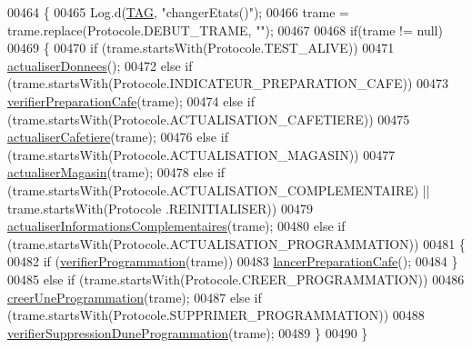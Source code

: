\begin{DoxyCode}
00464     \{
00465         Log.d(\hyperlink{classcom_1_1example_1_1ekawa_1_1_cafetiere_aa0c1fd99a2508b06c462aea17034aa91}{TAG}, \textcolor{stringliteral}{"changerEtats()"});
00466         trame = trame.replace(Protocole.DEBUT\_TRAME, \textcolor{stringliteral}{""});
00467 
00468         \textcolor{keywordflow}{if}(trame != null)
00469         \{
00470             \textcolor{keywordflow}{if} (trame.startsWith(Protocole.TEST\_ALIVE))
00471                 \hyperlink{classcom_1_1example_1_1ekawa_1_1_cafetiere_a1c6b2ea0e069cda876260e18ea8f6e84}{actualiserDonnees}();
00472             \textcolor{keywordflow}{else} \textcolor{keywordflow}{if} (trame.startsWith(Protocole.INDICATEUR\_PREPARATION\_CAFE))
00473                 \hyperlink{classcom_1_1example_1_1ekawa_1_1_cafetiere_ac2f81a08528b9f7017bfe6183fde876f}{verifierPreparationCafe}(trame);
00474             \textcolor{keywordflow}{else} \textcolor{keywordflow}{if} (trame.startsWith(Protocole.ACTUALISATION\_CAFETIERE))
00475                 \hyperlink{classcom_1_1example_1_1ekawa_1_1_cafetiere_a6485aa7504eeb5c3c09accab52bb3ad1}{actualiserCafetiere}(trame);
00476             \textcolor{keywordflow}{else} \textcolor{keywordflow}{if} (trame.startsWith(Protocole.ACTUALISATION\_MAGASIN))
00477                 \hyperlink{classcom_1_1example_1_1ekawa_1_1_cafetiere_a406c04398043ee4abca9902828197d91}{actualiserMagasin}(trame);
00478             \textcolor{keywordflow}{else} \textcolor{keywordflow}{if} (trame.startsWith(Protocole.ACTUALISATION\_COMPLEMENTAIRE) || trame.startsWith(Protocole
      .REINITIALISER))
00479                 \hyperlink{classcom_1_1example_1_1ekawa_1_1_cafetiere_af968afecce6625f466b145a54e8b1d44}{actualiserInformationsComplementaires}(trame);
00480             \textcolor{keywordflow}{else} \textcolor{keywordflow}{if} (trame.startsWith(Protocole.ACTUALISATION\_PROGRAMMATION))
00481             \{
00482                 \textcolor{keywordflow}{if} (\hyperlink{classcom_1_1example_1_1ekawa_1_1_cafetiere_ac3f2b337d1fd091faa312c2c6ec08bfc}{verifierProgrammation}(trame))
00483                     \hyperlink{classcom_1_1example_1_1ekawa_1_1_cafetiere_ac79907a8b3499bb9b2f50e31f8c904e8}{lancerPreparationCafe}();
00484             \}
00485             \textcolor{keywordflow}{else} \textcolor{keywordflow}{if} (trame.startsWith(Protocole.CREER\_PROGRAMMATION))
00486                 \hyperlink{classcom_1_1example_1_1ekawa_1_1_cafetiere_a8664d05f55227160182de50a7c31ccf3}{creerUneProgrammation}(trame);
00487             \textcolor{keywordflow}{else} \textcolor{keywordflow}{if} (trame.startsWith(Protocole.SUPPRIMER\_PROGRAMMATION))
00488                 \hyperlink{classcom_1_1example_1_1ekawa_1_1_cafetiere_a316296ae1fad708259a403c60099caa1}{verifierSuppressionDuneProgrammation}(trame);
00489         \}
00490     \}
\end{DoxyCode}
\mbox{\label{classcom_1_1example_1_1ekawa_1_1_cafetiere_a6fa4b1560875b71d339a9f6c24c5336d}} 
